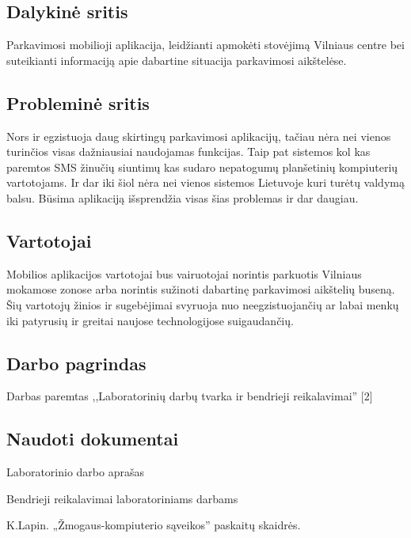 \documentclass{VUMIFPSkursinis}
\begin{document}
\subsection*{Dalykinė sritis}

Parkavimosi mobilioji aplikacija, leidžianti apmokėti stovėjimą Vilniaus centre bei suteikianti informaciją apie dabartine situacija parkavimosi aikštelėse.

\subsection*{Probleminė sritis}

Nors ir egzistuoja daug skirtingų parkavimosi aplikacijų, tačiau nėra nei vienos turinčios visas dažniausiai naudojamas funkcijas. Taip pat sistemos kol kas paremtos SMS žinučių siuntimų kas sudaro nepatogumų planšetinių kompiuterių vartotojams. Ir dar iki šiol nėra nei vienos sistemos Lietuvoje kuri turėtų valdymą balsu. Būsima aplikaciją išsprendžia visas šias problemas ir dar daugiau.

\subsection*{Vartotojai}

Mobilios aplikacijos vartotojai bus vairuotojai norintis parkuotis Vilniaus mokamose zonose arba norintis sužinoti dabartinę parkavimosi aikštelių buseną. Šių vartotojų žinios ir sugebėjimai svyruoja nuo neegzistuojančių ar labai menkų iki patyrusių ir greitai naujose technologijose suigaudančių. 


\subsection*{Darbo pagrindas}

Darbas paremtas ,,Laboratorinių darbų tvarka ir bendrieji reikalavimai'' [2]

\subsection*{Naudoti dokumentai}

\begin{enumerate} [label = {[\arabic*]}]
	\item Laboratorinio darbo aprašas
	\item Bendrieji reikalavimai laboratoriniams darbams
	\item K.Lapin. „Žmogaus-kompiuterio sąveikos” paskaitų skaidrės. 
\end{enumerate}
\end{document}
